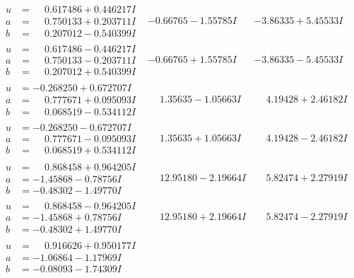 \documentclass[1p]{elsarticle_modified}
\theoremstyle{definition}
\begin{document}
$$\begin{array}{c|c|c}
\begin{aligned}
u &= \phantom{-}0.617486 + 0.446217 I \\
a &= \phantom{-}0.750133 + 0.203711 I \\
b &= \phantom{-}0.207012 - 0.540399 I\end{aligned}
 & -0.66765 - 1.55785 I & -3.86335 + 5.45533 I \\ \hline\begin{aligned}
u &= \phantom{-}0.617486 - 0.446217 I \\
a &= \phantom{-}0.750133 - 0.203711 I \\
b &= \phantom{-}0.207012 + 0.540399 I\end{aligned}
 & -0.66765 + 1.55785 I & -3.86335 - 5.45533 I \\ \hline\begin{aligned}
u &= -0.268250 + 0.672707 I \\
a &= \phantom{-}0.777671 + 0.095093 I \\
b &= \phantom{-}0.068519 - 0.534112 I\end{aligned}
 & \phantom{-}1.35635 - 1.05663 I & \phantom{-}4.19428 + 2.46182 I \\ \hline\begin{aligned}
u &= -0.268250 - 0.672707 I \\
a &= \phantom{-}0.777671 - 0.095093 I \\
b &= \phantom{-}0.068519 + 0.534112 I\end{aligned}
 & \phantom{-}1.35635 + 1.05663 I & \phantom{-}4.19428 - 2.46182 I \\ \hline\begin{aligned}
u &= \phantom{-}0.868458 + 0.964205 I \\
a &= -1.45868 - 0.78756 I \\
b &= -0.48302 - 1.49770 I\end{aligned}
 & \phantom{-}12.95180 - 2.19664 I & \phantom{-}5.82474 + 2.27919 I \\ \hline\begin{aligned}
u &= \phantom{-}0.868458 - 0.964205 I \\
a &= -1.45868 + 0.78756 I \\
b &= -0.48302 + 1.49770 I\end{aligned}
 & \phantom{-}12.95180 + 2.19664 I & \phantom{-}5.82474 - 2.27919 I \\ \hline\begin{aligned}
u &= \phantom{-}0.916626 + 0.950177 I \\
a &= -1.06864 - 1.17969 I \\
b &= -0.08093 - 1.74309 I\end{aligned}

\end{array}$$
\end{document}
